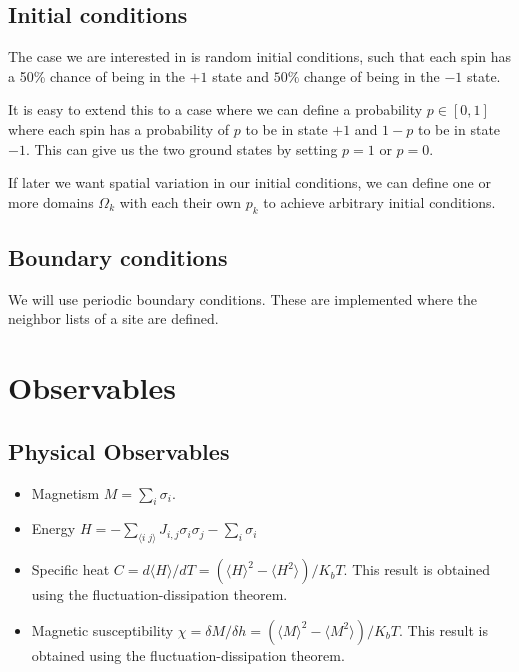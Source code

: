 \documentclass[]{scrartcl}
\begin{document}
	\subsection{Initial conditions}
	The case we are interested in is random initial conditions, such that each spin has a 50\% chance of being in the $+1$ state and $50\%$ change of being in the $-1$ state. 
	
	It is easy to extend this to a case where we can define a probability $p\in [0,1]$ where each spin has a probability of $p$ to be in state $+1$ and $1-p$ to be in state $-1$. This can give us the two ground states by setting $p=1$ or $p=0$.
	
	If later we want spatial variation in our initial conditions, we can define one or more domains $\Omega_k$ with each their own $p_k$ to achieve arbitrary initial conditions. 
	
	\subsection{Boundary conditions}
	We will use periodic boundary conditions. These are implemented where the neighbor lists of a site are defined.
	
	\section{Observables}
	
	\subsection{Physical Observables}
	\begin{itemize}
		\item Magnetism $M = \sum_i \sigma_i$.
		\item Energy $H = -\sum_{\langle i \;  j \rangle} J_{i,j} \sigma_i \sigma_j -\sum_i \sigma_i$ 
		\item Specific heat $C = d\langle H \rangle/d T  = (\langle H \rangle ^2 - \langle H^2 \rangle )/K_bT$. This result is obtained using the fluctuation-dissipation theorem.
		\item Magnetic susceptibility $\chi = \delta M / \delta h = (\langle M \rangle ^2 - \langle M^2 \rangle )/K_bT$. This result is obtained using the fluctuation-dissipation theorem.
	\end{itemize}
	
\end{document}
